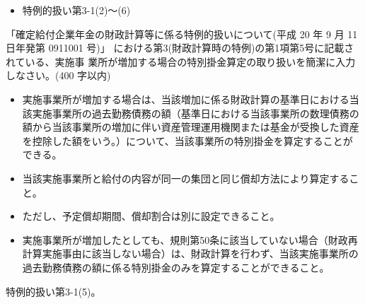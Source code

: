 \begin{InyouJobunbox}
  \begin{itemize}
    \item 特例的扱い第3-1(2)〜(6)
  \end{itemize}
\end{InyouJobunbox}


\begin{shortanswer}[年金2 2024 問題2(5)]
  「確定給付企業年金の財政計算等に係る特例的扱いについて(平成 20 年 9 月 11 日年発第 0911001 号)」
  における第3(財政計算時の特例)の第1項第5号に記載されている、実施事
  業所が増加する場合の特別掛金算定の取り扱いを簡潔に入力しなさい。(400 字以内)
\end{shortanswer}

\begin{answerbox}
  \begin{itemize}
    \item 実施事業所が増加する場合は、当該増加に係る財政計算の基準日における当該実施事業所の過去勤務債務の額（基準日における当該事業所の数理債務の額から当該事業所の増加に伴い資産管理運用機関または基金が受換した資産を控除した額をいう。）について、当該事業所の特別掛金を算定することができる。
    \item 当該実施事業所と給付の内容が同一の集団と同じ償却方法により算定すること。
    \item ただし、予定償却期間、償却割合は別に設定できること。
    \item 実施事業所が増加したとしても、規則第50条に該当していない場合（財政再計算実施事由に該当しない場合）は、財政計算を行わず、当該実施事業所の過去勤務債務の額に係る特別掛金のみを算定することができること。
  \end{itemize}
\end{answerbox}

\begin{explanationbox}
  特例的扱い第3-1(5)。
\end{explanationbox}

